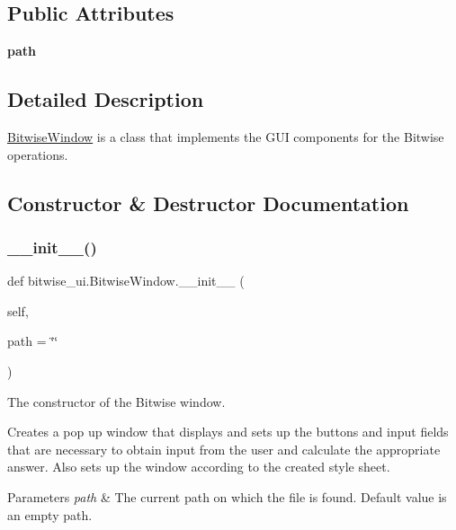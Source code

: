 \subsection*{Public Attributes}
\begin{DoxyCompactItemize}
\item 
\mbox{\label{classbitwise__ui_1_1_bitwise_window_a50c5338d7eec89d033c090bd0efd525a}} 
{\bfseries path}
\end{DoxyCompactItemize}


\subsection{Detailed Description}
\hyperlink{classbitwise__ui_1_1_bitwise_window}{Bitwise\+Window} is a class that implements the G\+UI components for the Bitwise operations. 

\subsection{Constructor \& Destructor Documentation}
\mbox{\label{classbitwise__ui_1_1_bitwise_window_a5f91a64a61e0cd5282e40925c4417171}} 
\subsubsection{\texorpdfstring{\+\_\+\+\_\+init\+\_\+\+\_\+()}{\_\_init\_\_()}}
{\footnotesize\ttfamily def bitwise\+\_\+ui.\+Bitwise\+Window.\+\_\+\+\_\+init\+\_\+\+\_\+ (\begin{DoxyParamCaption}\item[{}]{self,  }\item[{}]{path = {\ttfamily \char`\"{}\char`\"{}} }\end{DoxyParamCaption})}



The constructor of the Bitwise window. 

Creates a pop up window that displays and sets up the buttons and input fields that are necessary to obtain input from the user and calculate the appropriate answer. Also sets up the window according to the created style sheet. 
\begin{DoxyParams}{Parameters}
{\em path} & The current path on which the file is found. Default value is an empty path. \\
\hline
\end{DoxyParams}


